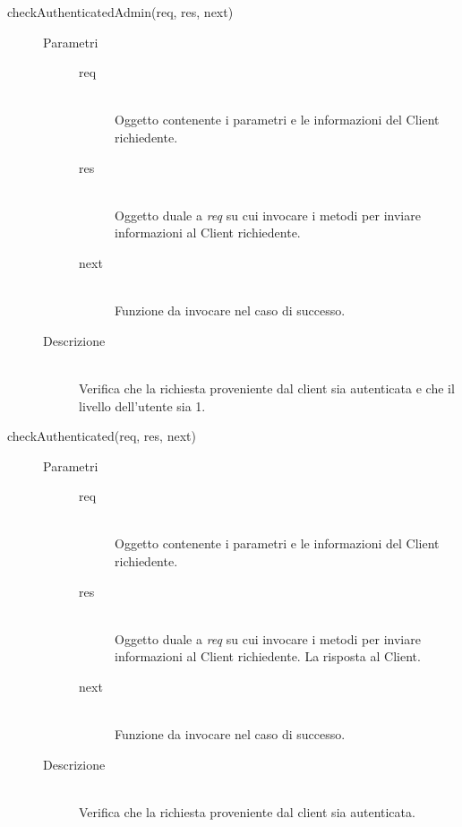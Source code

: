 \begin{description}
\begin{description}
     \item[checkAuthenticatedAdmin(req, res, next)] \hfill 
          \begin{description}
            \item[Parametri] \hfill
            \begin{description}
             \item[req] \hfill \\
	         Oggetto contenente i parametri e le informazioni del Client richiedente.
	         \item[res] \hfill \\
	         Oggetto duale a \textit{req} su cui invocare i metodi per inviare informazioni al Client richiedente.
             \item[next] \hfill \\
             Funzione da invocare nel caso di successo.
            \end{description}
            \item[Descrizione] \hfill \\
            Verifica che la richiesta proveniente dal client sia autenticata e che il livello dell'utente sia 1. 
         \end{description}
     \item[checkAuthenticated(req, res, next)] \hfill 
     \begin{description}
      \item[Parametri] \hfill
      \begin{description}
       \item[req] \hfill \\
	    Oggetto contenente i parametri e le informazioni del Client richiedente.
	    \item[res] \hfill \\
	    Oggetto duale a \textit{req} su cui invocare i metodi per inviare informazioni al Client richiedente.
        La risposta al Client.
       \item[next] \hfill \\
        Funzione da invocare nel caso di successo.
      \end{description}
      \item[Descrizione] \hfill \\
      Verifica che la richiesta proveniente dal client sia autenticata.
     \end{description}
     

\end{description}
\end{description}
